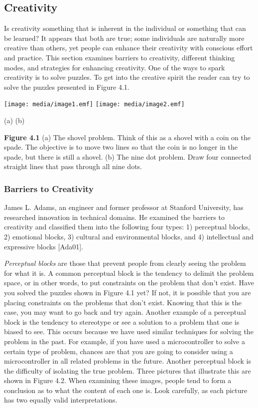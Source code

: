 \subsection{Creativity}\label{creativity}

Is creativity something that is inherent in the individual or something
that can be learned? It appears that both are true; some individuals are
naturally more creative than others, yet people can enhance their
creativity with conscious effort and practice. This section examines
barriers to creativity, different thinking modes, and strategies for
enhancing creativity. One of the ways to spark creativity is to solve
puzzles. To get into the creative spirit the reader can try to solve the
puzzles presented in Figure 4.1.

\texttt{[image: media/image1.emf]}
\texttt{[image: media/image2.emf]}

(a) (b)

\textbf{Figure 4.1} (a) The shovel problem. Think of this as a shovel
with a coin on the spade. The ob­jective is to move two lines so that the
coin is no longer in the spade, but there is still a shovel. (b) The
nine dot problem. Draw four connected straight lines that pass through
all nine dots.

\subsubsection{Barriers to Creativity}\label{barriers-to-creativity}

James L. Adams, an engineer and former professor at Stanford University,
has researched in­novation in technical domains. He examined the barriers
to creativity and classified them into the following four types: 1)
perceptual blocks, 2) emotional blocks, 3) cultural and environ­mental
blocks, and 4) intellectual and expressive blocks {[}Ada01{]}.

\emph{Perceptual blocks} are those that prevent people from clearly
seeing the problem for what it is. A common perceptual block is the
tendency to delimit the problem space, or in other words, to put
constraints on the problem that don't exist. Have you solved the puzzles
shown in Figure 4.1 yet? If not, it is possible that you are placing
constraints on the problems that don't exist. Knowing that this is the
case, you may want to go back and try again. Another example of a
perceptual block is the tendency to stereotype or see a solution to a
problem that one is biased to see. This occurs because we have used
similar techniques for solving the problem in the past. For example, if
you have used a microcontroller to solve a certain type of problem,
chances are that you are going to consider using a microcontroller in
all related problems in the future. Another perceptual block is the
difficulty of isolating the true problem. Three pictures that illustrate
this are shown in Figure 4.2. When examining these images, people tend
to form a conclusion as to what the content of each one is. Look
carefully, as each picture has two equally valid interpretations.


